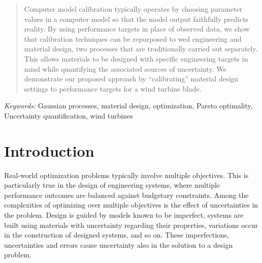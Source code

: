 \documentclass[12pt]{article}
\begin{document}
\bigskip
\begin{abstract}
%
%
Computer model calibration typically operates by choosing parameter values in a computer model so that the model output faithfully predicts reality. 
%
By using performance targets in place of observed data, we show that calibration techniques can be repurposed to wed engineering and material design, two processes that are traditionally carried out separately.
% 
This allows materials to be designed with specific engineering targets in mind while quantifying the associated sources of uncertainty. 
%
We demonstrate our proposed approach by ``calibrating'' material design settings to performance targets for a wind turbine blade. %
\end{abstract}

\noindent%
{\it Keywords:}  Gaussian processes, material design, optimization, Pareto optimality, Uncertainty quantification, wind turbines
\vfill

\newpage
{} %
\section{Introduction}
\label{introduction}

Real-world optimization problems typically involve multiple objectives. 
%
This is particularly true in the design of engineering systems, where multiple performance outcomes are balanced against budgetary constraints. 
%
Among the complexities of optimizing over multiple objectives is the effect of uncertainties in the problem. 
%
Design is guided by models known to be imperfect, systems are built using materials with uncertainty regarding their properties, variations occur in the construction of designed systems, and so on. 
%
These imperfections, uncertainties and errors cause uncertainty also in the solution to a design problem. 
%
\end{document}
